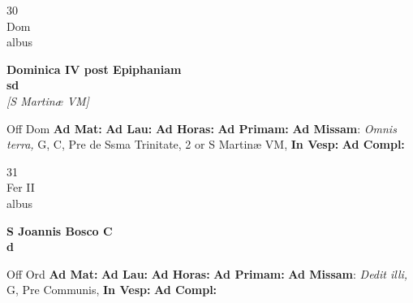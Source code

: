 \documentclass[10pt, openany]{book}
\begin{document}
        \begin{center}
            \begin{minipage}{3.5in}
                \vspace{2em}
                \begin{minipage}{0.5in}
                    {\Huge 30} \\
                    {\normalsize Dom} \\
                    {\normalsize albus}
                \end{minipage}
                \begin{minipage}{3.0in}
                    \textbf{ \large Dominica IV post Epiphaniam \\
                    \textnormal{\normalsize sd}} \\ \textit{[S Martinæ VM]} \\ 
                \end{minipage}
                \begin{justify}Off Dom
                    \textbf{Ad Mat: }
                    \textbf{Ad Lau: }
                    \textbf{Ad Horas: }
                    \textbf{Ad Primam: }\textbf{Ad Missam}: \textit{Omnis terra,} G, C, Pre de Ssma Trinitate, 2 or S Martinæ VM,  
                    \textbf{In Vesp: }
                    \textbf{Ad Compl: }
                \end{justify}
            \end{minipage}
        \end{center}
    
        \begin{center}
            \begin{minipage}{3.5in}
                \vspace{2em}
                \begin{minipage}{0.5in}
                    {\Huge 31} \\
                    {\normalsize Fer II} \\
                    {\normalsize albus}
                \end{minipage}
                \begin{minipage}{3.0in}
                    \textbf{ \large S Joannis Bosco C \\
                    \textnormal{\normalsize d}} \\ 
                \end{minipage}
                \begin{justify}Off Ord
                    \textbf{Ad Mat: }
                    \textbf{Ad Lau: }
                    \textbf{Ad Horas: }
                    \textbf{Ad Primam: }\textbf{Ad Missam}: \textit{Dedit illi,} G, Pre Communis,  
                    \textbf{In Vesp: }
                    \textbf{Ad Compl: }
                \end{justify}
            \end{minipage}
        \end{center}
    
\end{document}
